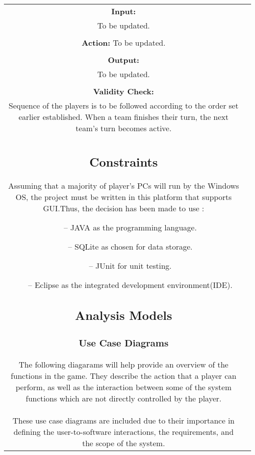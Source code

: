 \documentclass[10pt, a4paper]{article}
\begin{document}
\begin{table}[htbp]
\begin{center}
\begin{tabular}{| c | c |}
		\textbf{Input:}\\
		To be updated.\\
		\\
		\textbf{Action:}
		To be updated.\\
		\\
		\textbf{Output:}\\
		To be updated.\\
		\\
		\textbf{Validity Check:}\\
		Sequence of the players is to be followed according to the order set earlier established. When a team finishes their turn, the next team's turn becomes active.\\
		
	
	\subsection{Constraints}
	
	Assuming that a majority of player's PCs will run by the Windows OS, the project must be written in this platform that supports GUI.Thus, the decision has been made to use :
	\begin{itemize}
		\item[--] JAVA as the programming language.
		\item[--] SQLite as chosen for data storage.
		\item[--] JUnit for unit testing.
		\item[--] Eclipse as the integrated development environment(IDE).
	\end{itemize}
	
	\subsection{Analysis Models}
	
		\subsubsection{Use Case Diagrams}
		
		The following diagarams will help provide an overview of the functions in the game. They describe the action that a player can perform, as well as the interaction between some of the system functions which are not directly controlled by the player.\\
		
		These use case diagrams are included due to their importance in defining the user-to-software interactions, the requirements, and the scope of the system.\\
		

\end{tabular}
\end{center}
\end{table}
\end{document}
